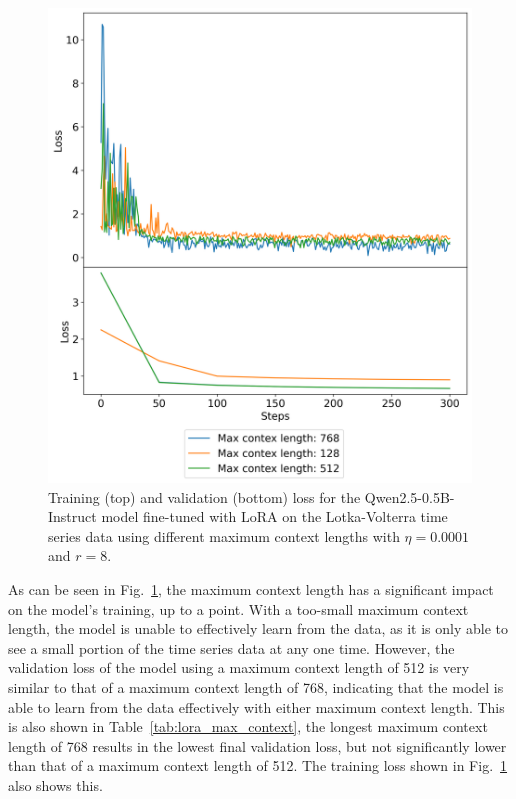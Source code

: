 \documentclass[11pt,a4paper]{article}
\begin{document}
\begin{figure}
    \centering
    \includegraphics[width=\columnwidth, keepaspectratio]{../plots/lora_ctx_loss.png}
    \caption{Training (top) and validation (bottom) loss for the Qwen2.5-0.5B-Instruct model fine-tuned with LoRA on the Lotka-Volterra time series data using different maximum context lengths with $\eta=0.0001$ and $r=8$.}
    \label{fig:lora_max_context_loss}
\end{figure}

As can be seen in Fig.~\ref{fig:lora_max_context_loss}, the maximum context length has a significant impact on the model's training, up to a point. With a too-small maximum context length, the model is unable to effectively learn from the data, as it is only able to see a small portion of the time series data at any one time. However, the validation loss of the model using a maximum context length of 512 is very similar to that of a maximum context length of 768, indicating that the model is able to learn from the data effectively with either maximum context length. This is also shown in Table~\ref{tab:lora_max_context}, the longest maximum context length of 768 results in the lowest final validation loss, but not significantly lower than that of a maximum context length of 512. The training loss shown in Fig.~\ref{fig:lora_max_context_loss} also shows this.
\end{document}

